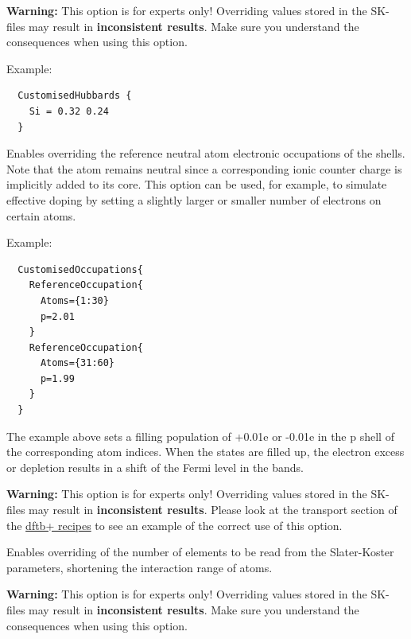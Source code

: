 \begin{description}
  \textbf{Warning:} This option is for experts only! Overriding values stored in the SK-files may
  result in \textbf{inconsistent results}. Make sure you understand the consequences when using this
  option.

  Example:
  \begin{verbatim}
  CustomisedHubbards {
    Si = 0.32 0.24
  }
  \end{verbatim}

\item[\kw{CustomisedOccupations} / \is{CustomizedOccupations}] Enables
  overriding the reference neutral atom electronic occupations of the
  shells. Note that the atom remains neutral since a corresponding ionic counter
  charge is implicitly added to its core. This option can be used, for example,
  to simulate effective doping by setting a slightly larger or smaller number of
  electrons on certain atoms.

  Example:
  \begin{verbatim}
  CustomisedOccupations{
    ReferenceOccupation{
      Atoms={1:30}
      p=2.01
    }
    ReferenceOccupation{
      Atoms={31:60}
      p=1.99
    }
  }
  \end{verbatim}

  The example above sets a filling population of +0.01e or -0.01e in the p shell
  of the corresponding atom indices. When the states are filled up, the electron
  excess or depletion results in a shift of the Fermi level in the bands.

  \textbf{Warning:} This option is for experts only! Overriding values stored in
  the SK-files may result in \textbf{inconsistent results}. Please look at the
  transport section of the
  \href{https://dftbplus-recipes.readthedocs.io/en/latest/}{dftb+ recipes} to
  see an example of the correct use of this option.

\item[\is{TruncateSKRange}] Enables overriding of the number of elements to be
  read from the Slater-Koster parameters, shortening the interaction range of
  atoms.

  \textbf{Warning:} This option is for experts only! Overriding values stored in
  the SK-files may result in \textbf{inconsistent results}. Make sure you
  understand the consequences when using this option.


\end{description}
